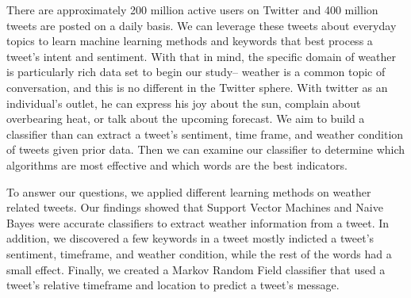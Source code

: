 There are approximately 200 million active users on Twitter and 400 million tweets are posted on a daily basis. We can leverage these tweets about everyday topics to learn machine learning methods and keywords that best process a tweet's intent and sentiment. With that in mind, the specific domain of weather is particularly rich data set to begin our study– weather is a common topic of conversation, and this is no different in the Twitter sphere. With twitter as an individual's outlet, he can express his joy about the sun, complain about overbearing heat, or talk about the upcoming forecast. We aim to build a classifier than can extract a tweet's sentiment, time frame, and weather condition of tweets given prior data. Then we can examine our classifier to determine which algorithms are most effective and which words are the best indicators.

To answer our questions, we applied different learning methods on weather related tweets. Our findings showed that Support Vector Machines and Naive Bayes were accurate classifiers to extract weather information from a tweet. In addition, we discovered a few keywords in a tweet mostly indicted a tweet's sentiment, timeframe, and weather condition, while the rest of the words had a small effect. Finally, we created a Markov Random Field classifier that used a tweet's relative timeframe and location to predict a tweet's message.